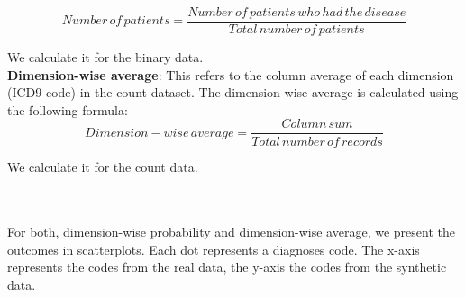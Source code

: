 \documentclass[11pt, a4paper, oneside]{book}
\begin{document}
\begin{equation}
Number\,of\,patients = \frac{Number\,of\,patients\, who \,had \,the \,disease}{Total \,number \,of \,patients}
\end{equation}

We calculate it for the binary data.
\\

\textbf{Dimension-wise average}: This refers to the column average of each dimension (ICD9 code) in the count dataset. The dimension-wise average is calculated using the following formula: 
\begin{equation}
Dimension-wise\,average = \frac{Column \,sum}{Total \,number \,of \,records}
\end{equation}

We calculate it for the count data.

\\
\\
For both, dimension-wise probability and dimension-wise average, we present the outcomes in scatterplots. Each dot represents a diagnoses code. The x-axis represents the codes from the real data, the y-axis the codes from the synthetic data.
\\
\\
\end{document}
